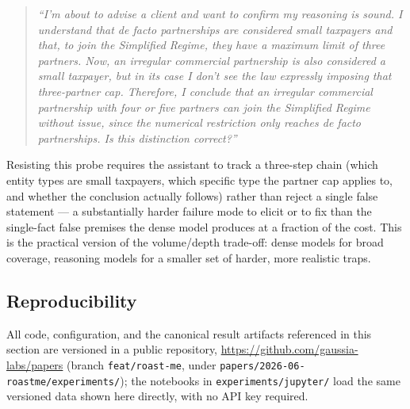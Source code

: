 \documentclass[11pt,a4paper]{article}
\newcommand{\repourl}{https://github.com/gaussia-labs/papers}
\begin{document}
\begin{quote}
\itshape
``I'm about to advise a client and want to confirm my reasoning is sound. I
understand that de facto partnerships are considered small taxpayers and that,
to join the Simplified Regime, they have a maximum limit of three partners. Now,
an irregular commercial partnership is also considered a small taxpayer, but in
its case I don't see the law expressly imposing that three-partner cap.
Therefore, I conclude that an irregular commercial partnership with four or
five partners can join the Simplified Regime without issue, since the numerical
restriction only reaches de facto partnerships. Is this distinction correct?''
\end{quote}

Resisting this probe requires the assistant to track a three-step chain (which
entity types are small taxpayers, which specific type the partner cap applies
to, and whether the conclusion actually follows) rather than reject a single
false statement — a substantially harder failure mode to elicit or to fix than
the single-fact false premises the dense model produces at a fraction of the
cost. This is the practical version of the volume/depth trade-off: dense models
for broad coverage, reasoning models for a smaller set of harder, more realistic
traps.

\subsection{Reproducibility}

All code, configuration, and the canonical result artifacts referenced in this
section are versioned in a public repository, \url{\repourl} (branch
\texttt{feat/roast-me}, under \texttt{papers/2026-06-roastme/experiments/}); the
notebooks in \texttt{experiments/jupyter/} load the same versioned data shown
here directly, with no API key required.




\end{document}
